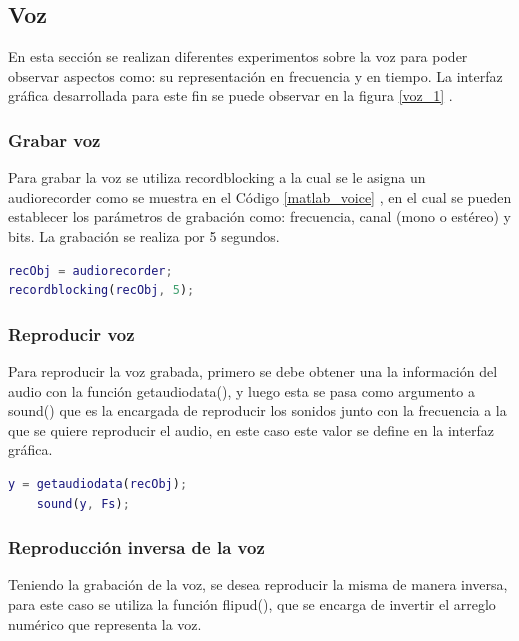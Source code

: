 \documentclass[comsoc, journal]{IEEEtran}
\begin{document}
\subsection{Voz}
En esta sección se realizan diferentes experimentos sobre la voz para poder observar aspectos como: su representación en frecuencia y en tiempo. La interfaz gráfica desarrollada para este fin se puede observar en la figura \ref{voz_1} .

\subsubsection{Grabar voz}

Para grabar la voz se utiliza recordblocking a la cual se le asigna un audiorecorder como se muestra en el Código \ref{matlab_voice} , en el cual se pueden establecer los parámetros de grabación como: frecuencia, canal (mono o estéreo) y bits. La grabación se realiza por 5 segundos.

\begin{lstlisting}[caption={Grabar voz},label={matlab_voice},language=Matlab]
recObj = audiorecorder;
recordblocking(recObj, 5);
\end{lstlisting}

\subsubsection{Reproducir voz}

Para reproducir la voz grabada, primero se debe obtener una la información del  audio con la función  getaudiodata(), y luego esta se pasa como argumento a sound() que es la encargada de reproducir los sonidos junto con la frecuencia a la que se quiere reproducir el audio, en este caso este valor se define en la interfaz gráfica.

\begin{lstlisting}[caption={Reproducir sonido},label={matlab_playsound},language=Matlab]
	y = getaudiodata(recObj);
    sound(y, Fs);
\end{lstlisting}

\subsubsection{Reproducción inversa de la voz}

Teniendo la grabación de la voz, se desea reproducir la misma de manera inversa, para este caso se utiliza la función flipud(), que se encarga de invertir el arreglo numérico que representa la voz.
\end{document}
